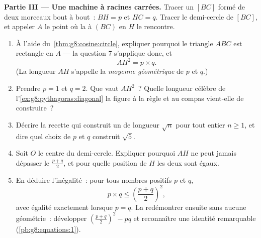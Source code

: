 \begin{problem}[{Devoir maison --- la hauteur d'un triangle
rectangle~: $AB^2 = BH \times BC$, $AH^2 = BH \times HC$, une seconde
démonstration de Pythagore, et une machine à construire des racines
carrées}]
\medskip
\noindent\textbf{Partie III --- Une machine à racines carrées.}
Tracer un  $[BC]$ formé de deux morceaux bout à bout~:
$BH = p$ et $HC = q$. Tracer le demi-cercle de  $[BC]$, et
appeler $A$ le point où la  à $(BC)$ en $H$ le
rencontre.
\begin{enumerate}[resume]
  \item À l'aide du~\cref{thm:g8:cosine:circle}, expliquer pourquoi
        le triangle $ABC$ est rectangle en $A$ --- la question 7
        s'applique donc, et
        \[
        AH^2 = p \times q .
        \]
        (La longueur $AH$ s'appelle la \emph{moyenne
        géométrique} de $p$ et $q$.)
  \item Prendre $p = 1$ et $q = 2$. Que vaut $AH^2$~? Quelle
        longueur célèbre de l'\cref{ex:g8:pythagoras:diagonal} la
        figure à la règle et au compas vient-elle de construire~?
  \item Décrire la recette qui construit un  de longueur
        $\sqrt n$ pour tout entier $n \geq 1$, et dire quel choix de
        $p$ et $q$ construit $\sqrt 5$.
  \item Soit $O$ le centre du demi-cercle. Expliquer pourquoi $AH$
        ne peut jamais dépasser le  $\frac{p + q}{2}$, et pour
        quelle position de $H$ les deux sont égaux.
  \item En déduire l'inégalité~: pour tous nombres positifs $p$ et
        $q$,
        \[
        p \times q \leq \left(\frac{p + q}{2}\right)^2,
        \]
        avec égalité exactement lorsque $p = q$. La redémontrer
        ensuite sans aucune géométrie~: développer
        $\left(\frac{p+q}{2}\right)^2 - p q$ et reconnaître une
        identité remarquable (\cref{pb:g8:equations:1}).
\end{enumerate}
\end{problem}
